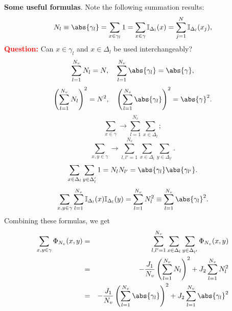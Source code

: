 	\textbf{Some useful formulas}. Note the following summation results:
\begin{equation}
	\label{eq:1}
	N_l \equiv \abs{\gamma_l} = \sum_{x \in \gamma_l} 1 = \sum_{x \in \gamma} \mathbb{I}_{\Delta_l}(x) = \sum_{j=1}^{N} \mathbb{I}_{\Delta_{l}}(x_j),
\end{equation}
\textbf{\textcolor{Red}{Question:}} Can $x \in \gamma_l$ and $x \in \Delta_l$ be used interchangeably?
\begin{equation}
	\label{eq:2}
	\sum_{l=1}^{N_v} N_l = N, \quad \sum_{l=1}^{N_v} \abs{\gamma_l} = \abs{\gamma},
\end{equation}
\begin{equation}
	\label{eq:3}
	\left(\sum_{l=1}^{N_v} N_l \right)^2 = N^2, \quad \left(\sum_{l=1}^{N_v} \abs{\gamma_l} \right)^2 = \abs{\gamma}^2.
\end{equation}
\begin{equation}
	\label{eq:4}
	\sum_{x \in \gamma} \rightarrow \sum_{l=1}^{N_v} \sum_{x \in \Delta_l};
\end{equation}
\begin{equation}
	\label{eq:5}
	\sum_{x,y \in \gamma} \rightarrow \sum_{l,l'=1}^{N_v} \sum_{x \in \Delta_l} \sum_{y \in \Delta_{l'}}.
\end{equation}
\begin{equation}
	\label{eq:6}
	\sum_{x \in \Delta_l}\sum_{y \in \Delta_l'} 1 = N_l N_{l'} = \abs{\gamma_l} \abs{\gamma_{l'}}.
\end{equation}
\begin{equation}
	\label{eq:sumII}
	\sum_{x,y \in \gamma}\sum_{l=1}^{N_v} \mathbb{I}_{\Delta_l}(x) \mathbb{I}_{\Delta_{l}}(y) = \sum_{l=1}^{N_v} N_l^2 \equiv \sum_{l=1}^{N_v} \abs{\gamma_l}^2.
\end{equation}
Combining these formulas, we get
\begin{eqnarray}
	\sum_{x,y \in \gamma} \Phi_{N_v}(x,y) & = & \sum_{l,l'=1}^{N_v} \sum_{x \in \Delta_l} \sum_{y \in \Delta_{l'}} \Phi_{N_v}(x,y)
	\nonumber\\
	& = & - \frac{J_1}{N_v} \left(\sum_{l=1}^{N_v} N_l\right)^2 + J_2\sum_{l=1}^{N_v}N_l^2
	\\
	& = & - \frac{J_1}{N_v} \left(\sum_{l=1}^{N_v} \abs{\gamma_l}\right)^2 + J_2\sum_{l=1}^{N_v}\abs{\gamma_l}^2
\end{eqnarray}